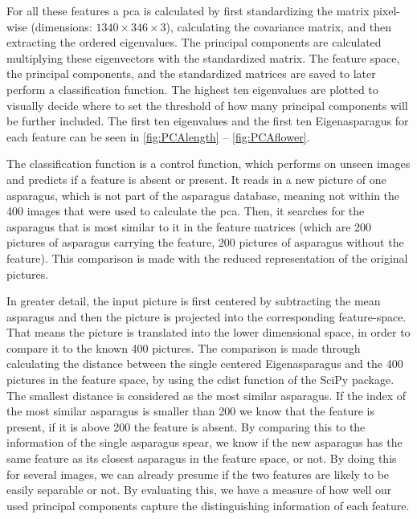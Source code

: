 
\bigskip
For all these features a \acrshort{pca} is calculated by first standardizing the matrix pixel-wise (dimensions: $1340\times346\times3$), calculating the covariance matrix, and then extracting the ordered eigenvalues. The principal components are calculated multiplying these eigenvectors with the standardized matrix. The feature space, the principal components, and the standardized matrices are saved to later perform a classification function. The highest ten eigenvalues are plotted to visually decide where to set the threshold of how many principal components will be further included. The first ten eigenvalues and the first ten Eigenasparagus for each feature can be seen in \autoref{fig:PCAlength} -- \autoref{fig:PCAflower}.

The classification function is a control function, which performs on unseen images and predicts if a feature is absent or present. It reads in a new picture of one asparagus, which is not part of the asparagus database, meaning not within the 400 images that were used to calculate the \acrshort{pca}. Then, it searches for the asparagus that is most similar to it in the feature matrices (which are 200 pictures of asparagus carrying the feature, 200 pictures of asparagus without the feature).  This comparison is made with the reduced representation of the original pictures.

In greater detail, the input picture is first centered by subtracting the mean asparagus and then the picture is projected into the corresponding feature-space. That means the picture is translated into the lower dimensional space, in order to compare it to the known 400 pictures. The comparison is made through calculating the distance between the single centered Eigenasparagus and the 400 pictures in the feature space, by using the cdist function of the SciPy package. The smallest distance is considered as the most similar asparagus. If the index of the most similar asparagus is smaller than 200 we know that the feature is present, if it is above 200 the feature is absent. By comparing this to the information of the single asparagus spear, we know if the new asparagus has the same feature as its closest asparagus in the feature space, or not. By doing this for several images, we can already presume if the two features are likely to be easily separable or not. By evaluating this, we have a measure of how well our used principal components capture the distinguishing information of each feature.

